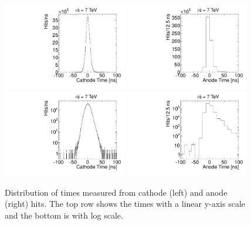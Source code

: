 \begin{figure}
  \begin{center}
      \includegraphics[clip=true, trim=0.0cm 0cm 0.0cm 0cm, width=0.48\textwidth]{figures/timing/CathodeTime}
      \includegraphics[clip=true, trim=0.0cm 0cm 0.0cm 0cm, width=0.48\textwidth]{figures/timing/AnodeTime} \\
      \includegraphics[clip=true, trim=0.0cm 0cm 0.0cm 0cm, width=0.48\textwidth]{figures/timing/CathodeTimeLog}
      \includegraphics[clip=true, trim=0.0cm 0cm 0.0cm 0cm, width=0.48\textwidth]{figures/timing/AnodeTimeLog} \\
      \caption[Distribution of times of anode and cathode hits.]
      {Distribution of times measured from cathode (left) and anode (right) hits.
The top row shows the times with a linear y-axis scale and the bottom is with log scale.
	}
      \label{fig:hittime}
  \end{center}
\end{figure}

